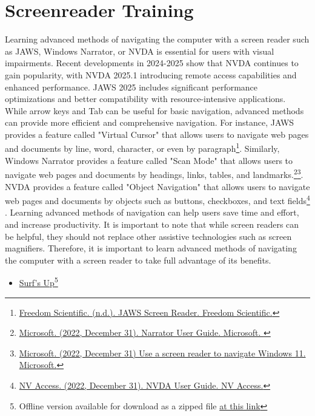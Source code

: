 \begin{itemize}
\hypertarget{appx7}{}\section[Screenreader Training]{Screenreader Training}\label{appx7}
Learning advanced methods of navigating the computer with a screen reader such as JAWS, Windows Narrator, or NVDA is essential for users with visual impairments. Recent developments in 2024-2025 show that NVDA continues to gain popularity, with NVDA 2025.1 introducing remote access capabilities and enhanced performance. JAWS 2025 includes significant performance optimizations and better compatibility with resource-intensive applications. While arrow keys and Tab can be useful for basic navigation, advanced methods can provide more efficient and comprehensive navigation. For instance, JAWS provides a feature called "Virtual Cursor" that allows users to navigate web pages and documents by line, word, character, or even by paragraph\footnote{\raggedright \href{https://www.freedomscientific.com/products/software/jaws}{Freedom Scientific. (n.d.). JAWS Screen Reader. Freedom Scientific.}}. Similarly, Windows Narrator provides a feature called "Scan Mode" that allows users to navigate web pages and documents by headings, links, tables, and landmarks.\footnote{\raggedright \href{https://support.microsoft.com/en-us/windows/narrator-user-guide-4b2e6b3f-1d6d-8a5c-4f6d2a3b3d6f}{Microsoft. (2022, December 31). Narrator User Guide. Microsoft. }}\footnote{\raggedright \href{https://support.microsoft.com/en-us/windows/use-a-screen-reader-to-navigate-windows-11-5f8a9e7c-7d3e-2d5a-0f5c-5f9b5b8a7a3d}{Microsoft. (2022, December 31) Use a screen reader to navigate Windows 11. Microsoft.}}. NVDA provides a feature called "Object Navigation" that allows users to navigate web pages and documents by objects such as buttons, checkboxes, and text fields\footnote{\raggedright \href{https://www.nvaccess.org/files/nvda/documentation/userGuide.html\#toc3.1}{NV Access. (2022, December 31). NVDA User Guide. NV Access.}} . Learning advanced methods of navigation can help users save time and effort, and increase productivity. It is important to note that while screen readers can be helpful, they should not replace other assistive technologies such as screen magnifiers. Therefore, it is important to learn advanced methods of navigating the computer with a screen reader to take full advantage of its benefits.
\begin{itemize}
 \item \href{https://www.freedomscientific.com/SurfsUp/}{Surf's Up}\footnote{\raggedright Offline version available for download as a zipped file \href{https://support.freedomscientific.com/SurfsUp/ZIP\_Surfs\_Up.zip}{at this link}}

\end{itemize}
\end{itemize}
